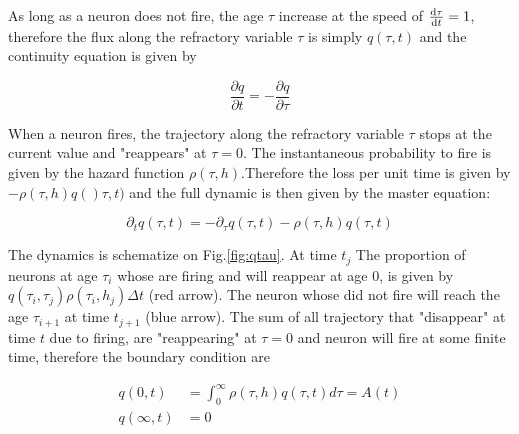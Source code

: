 \documentclass[12pt,twoside]{report}
\def \dd  {{\rm d}}
\begin{document}
As long as a neuron does not fire, the age $\tau$ increase at the speed of $\frac{\dd \tau}{\dd t}=1$, therefore the flux along the refractory variable $\tau$ is simply $q(\tau,t)$ and the continuity equation is given by

\begin{equation}
\label{eq:continuity1}
\frac{\partial q}{\partial t}=-\frac{\partial q}{\partial \tau}
\end{equation}

When a neuron fires, the trajectory along the refractory variable $\tau$ stops at the current value and "reappears" at $\tau=0$. The instantaneous probability to fire is given by the hazard function $\rho(\tau,h)$.Therefore the loss per unit time is given by $-\rho(\tau,h)q()\tau,t)$ and the full dynamic is then given by the master equation:

\begin{equation}
\label{eq:masterequation}
\partial_t q(\tau,t)=-\partial_\tau q(\tau,t)-\rho(\tau,h)q(\tau,t)
\end{equation}

The dynamics is schematize on Fig.\ref{fig:qtau}. At time $t_j$ The proportion of neurons at age $\tau_i$ whose are firing and will reappear at age $0$, is given by $q(\tau_i,\tau_j)\rho(\tau_i,h_j)\Delta t$ (red arrow). The neuron whose did not fire will reach the age $\tau_{i+1}$ at time $t_{j+1}$ (blue arrow). The sum of all trajectory that "disappear" at time $t$ due to firing, are "reappearing" at $\tau=0$ and neuron will fire at some finite time, therefore the boundary condition are

\begin{align}
\label{eq:boundarycondition}
q(0,t)&=\int_{0}^{\infty}\rho(\tau,h)q(\tau,t)d\tau=A(t) \\
q(\infty,t)&=0
\end{align}
\end{document}
